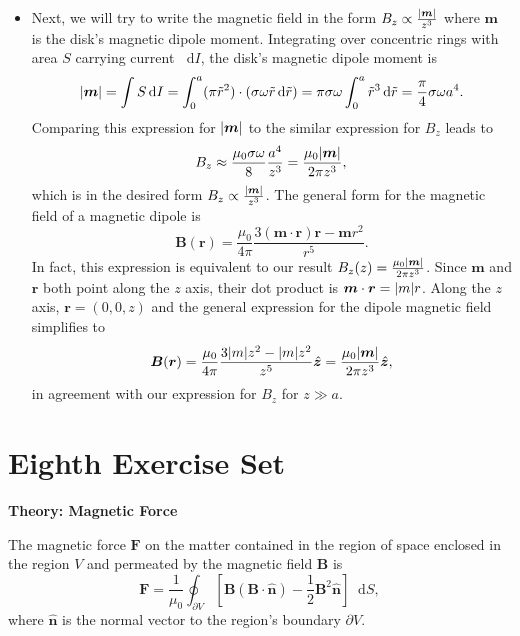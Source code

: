 \documentclass[11pt, a4paper]{article}
\newcommand{\diff}{\mathop{}\!\mathrm{d}} %
\renewcommand{\vec}[1]{\bm{#1}} %
\newcommand{\uvec}[1]{\hat{\vec{#1}}} %
\renewcommand{\t}[1]{\tilde{#1}} %
\renewcommand{\r}{\vec{r}}
\newcommand{\B}{\vec{B}}  %
\newcommand{\m}{\vec{m}}  %
\begin{document}
\begin{itemize}
	\item Next, we will try to write the magnetic field in the form $ B_{z} \propto \frac{\abs{\m}}{z^{3}} $ where $ \m $ is the disk's magnetic dipole moment. Integrating over concentric rings with area $ S $ carrying current $ \diff I $, the disk's magnetic dipole moment is
	\begin{equation*}
		\abs{\m} = \int S \diff I = \int_{0}^{a} (\pi \t{r}^{2}) \cdot (\sigma \omega \t{r}\diff \t{r}) = \pi \sigma \omega \int_{0}^{a} \t{r}^{3} \diff \t{r} = \frac{\pi}{4}\sigma \omega a^{4}.
	\end{equation*}
	Comparing this expression for $ \abs{\m} $ to the similar expression for $ B_{z} $ leads to 
	\begin{equation*}
		B_{z} \approx  \frac{\mu_{0}\sigma \omega}{8} \frac{a^{4}}{z^{3}} = \frac{\mu_{0}\abs{\m}}{2\pi z^{3}},
	\end{equation*}	
	which is in the desired form $  B_{z} \propto \frac{\abs{\m}}{z^{3}} $. The general form for the magnetic field of a magnetic dipole is
	\begin{equation*}
		\B(\r) = \frac{\mu_{0}}{4\pi}\frac{3(\m \cdot \r)\r - \m r^{2}}{r^{5}}.
	\end{equation*}
	In fact, this expression is equivalent to our result $ B_{z}(z) = \frac{\mu_{0}\abs{\m}}{2\pi z^{3}} $. Since $ \m $ and $ \r $ both point along the $ z $ axis, their dot product is $ \m \cdot \r = \abs{m}r $. Along the $ z $ axis, $ \r = (0, 0, z) $ and the general expression for the dipole magnetic field simplifies to
	\begin{equation*}
		\B(\r) = \frac{\mu_{0}}{4\pi} \frac{3\abs{m}z^{2} - \abs{m}z^{2}}{z^{5}}\uvec{z} = \frac{\mu_{0}\abs{\m}}{2\pi z^{3}} \uvec{z},
	\end{equation*}
	in agreement with our expression for $ B_{z} $ for $ z \gg a $.
	
\end{itemize}

\section{Eighth Exercise Set}

\textbf{Theory: Magnetic Force}\vspace{2mm}

The magnetic force $ \vec{F} $ on the matter contained in the region of space enclosed in the region $ V $ and permeated by the magnetic field $ \B $ is
\begin{equation*}
	\vec{F} = \frac{1}{\mu_{0}}\oint_{\partial V}\left [\B(\B \cdot \uvec{n}) - \frac{1}{2}\B^{2}\uvec{n}\right ] \diff S,
\end{equation*}
where $ \uvec{n} $ is the normal vector to the region's boundary $ \partial V $.
\end{document}
